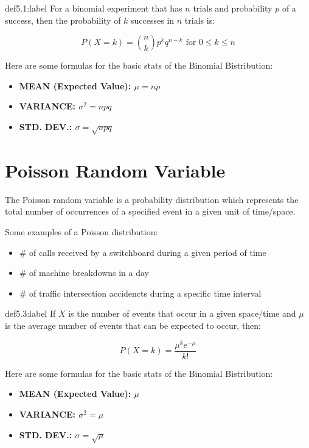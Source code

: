 \begin{definition}{def5.1:label}
    For a binomial experiment that has $n$ trials and probability $p$ of a success, then the probability of $k$ successes in $n$ trials is:

    $$
    P(X = k) = \binom{n}{k}p^kq^{n-k} \text{ for } 0 \le k \le n
    $$
\end{definition}

Here are some formulas for the basic stats of the Binomial Bistribution:

\begin{itemize}
    \item \bf{MEAN (Expected Value):} $\mu = np$
    \item \bf{VARIANCE:} $\sigma^2 = npq$
    \item \bf{STD. DEV.:} $\sigma = \sqrt{npq}$
\end{itemize}


\section{Poisson Random Variable}

The Poisson random variable is a probability distribution which represents the total number of occurrences of a specified event in a given unit of time/space.

Some examples of a Poisson distribution:

\begin{itemize}
    \item \# of calls received by a switchboard during a given period of time
    \item \# of machine breakdowns in a day
    \item \# of traffic intersection accidencts during a specific time interval
\end{itemize}

\begin{definition}{def5.3:label}
    If $X$ is the number of events that occur in a given space/time and $\mu$ is the average number of events that can be expected to occur, then:

    $$
    P(X = k) = \frac{\mu^ke^{-\mu}}{k!}
    $$
\end{definition}

Here are some formulas for the basic stats of the Binomial Bistribution:

\begin{itemize}
    \item \bf{MEAN (Expected Value):} $\mu$
    \item \bf{VARIANCE:} $\sigma^2 = \mu$
    \item \bf{STD. DEV.:} $\sigma = \sqrt{\mu}$
\end{itemize}



